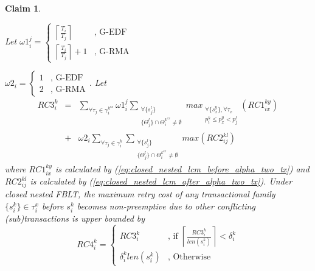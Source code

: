 \documentclass[letter]{sig-alternate}
\newtheorem{clm}{Claim}
\begin{document}
\begin{clm}\label{clm:closed_nested_lcm_before_delta}

Let $\omega1_{i}^{j}=\begin{cases}
\left\lceil \frac{T_{i}}{T_{j}}\right\rceil  & \mbox{, G-EDF}\\
\left\lceil \frac{T_{i}}{T_{j}}\right\rceil +1 & \mbox{, G-RMA}
\end{cases}$

$\omega2_{i}=\begin{cases}
1 & \mbox{, G-EDF}\\
2 & \mbox{, G-RMA}
\end{cases}$. Let
\begin{eqnarray}
RC3_{i}^{k} & = & \sum_{\forall\tau_{j}\in\gamma_{i}^{k^{ex}}}\omega1_{i}^{j}\sum_{\begin{array}{cc}
\forall\{s_{j}^{l}\}\\
\{\Theta_{j}^{l}\}\cap\Theta_{i}^{k^{ex}}\neq\emptyset
\end{array}}max_{\begin{array}{cc}
\forall\{s_{x}^{y}\},\forall\tau_{x}\\
p_{i}^{k}\le p_{x}^{y}<p_{j}^{l}
\end{array}}\left(RC1_{ix}^{ky}\right)\nonumber \\
 & + & \omega2_{i}\sum_{\forall\tau_{j}\in\gamma_{i}^{k}}\sum_{\begin{array}{cc}
\forall\{s_{j}^{l}\}\\
\{\Theta_{j}^{l}\}\cap\Theta_{i}^{k^{ex}}\neq\emptyset
\end{array}}max\left(RC2_{ij}^{kl}\right)\label{eq:closed_nested_lcm_before_delta}
\end{eqnarray}
where $RC1_{ix}^{ky}$ is calculated by (\ref{eq:closed_nested_lcm_before_alpha_two_tx})
and $RC2_{ij}^{kl}$ is calculated by (\ref{eq:closed_nested_lcm_after_alpha_two_tx}).
Under closed nested FBLT, the maximum retry cost of any transactional
family $\{s_{i}^{k}\}\in\tau_{i}^{x}$ before $s_{i}^{k}$ becomes
non-preemptive due to other conflicting (sub)transactions is upper
bounded by 
\begin{equation}
RC4_{i}^{k}=\begin{cases}
RC3_{i}^{k} & \mbox{, if }\left\lceil \frac{RC3_{i}^{k}}{len\left(s_{i}^{k}\right)}\right\rceil <\delta_{i}^{k}\\
\delta_{i}^{k}len\left(s_{i}^{k}\right) & \mbox{, Otherwise}
\end{cases}\label{eq:closed_nested_fblt_before_delta}
\end{equation}

\end{clm}
\end{document}
